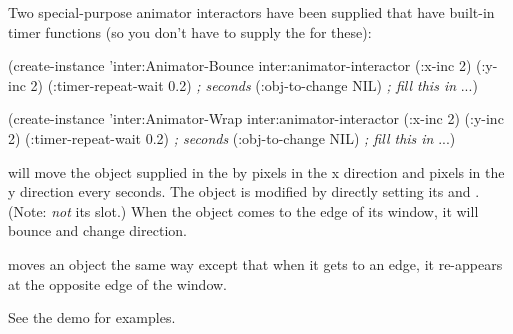 Two special-purpose animator interactors have been supplied that have
built-in timer functions (so you don't have to supply the
 for these):
\begin{programexample}
(create-instance 'inter:Animator-Bounce inter:animator-interactor
  (:x-inc 2)
  (:y-inc 2)
  (:timer-repeat-wait 0.2)  {\it ; seconds}
  (:obj-to-change NIL)      {\it ; fill this in}
  ...)

(create-instance 'inter:Animator-Wrap inter:animator-interactor
  (:x-inc 2)
  (:y-inc 2)
  (:timer-repeat-wait 0.2) {\it ; seconds}
  (:obj-to-change NIL)     {\it ; fill this in}
  ...)
\end{programexample}

 will move the object supplied in the
 by  pixels in the x direction and
 pixels in the y direction every 
seconds.  The object is modified by directly setting its 
and . (Note: {\it not} its  slot.)
When the object comes to the edge of its window, it will
bounce and change direction.

 moves an object the same way except that when it
gets to an edge, it re-appears at the opposite edge of the window.

See the demo  for examples.






% 
% 
% 
% 
% 
% 
% 
